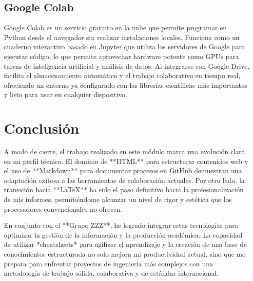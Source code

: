 \documentclass[runningheads]{llncs}
\begin{document}
\subsection{Google Colab}
Google Colab es un servicio gratuito en la nube que permite programar en Python desde el navegador sin realizar instalaciones locales. Funciona como un cuaderno interactivo basado en Jupyter que utiliza los servidores de Google para ejecutar código, lo que permite aprovechar hardware potente como GPUs para tareas de inteligencia artificial y análisis de datos. Al integrarse con Google Drive, facilita el almacenamiento automático y el trabajo colaborativo en tiempo real, ofreciendo un entorno ya configurado con las librerías científicas más importantes y listo para usar en cualquier dispositivo.



\section{Conclusión}
A modo de cierre, el trabajo realizado en este módulo marca una evolución clara en mi perfil técnico. El dominio de **HTML** para estructurar contenidos web y el uso de **Markdown** para documentar procesos en GitHub demuestran una adaptación exitosa a las herramientas de colaboración actuales. Por otro lado, la transición hacia **LaTeX** ha sido el paso definitivo hacia la profesionalización de mis informes, permitiéndome alcanzar un nivel de rigor y estética que los procesadores convencionales no ofrecen.

En conjunto con el **Grupo ZZZ**, he logrado integrar estas tecnologías para optimizar la gestión de la información y la producción académica. La capacidad de utilizar *cheatsheets* para agilizar el aprendizaje y la creación de una base de conocimientos estructurada no solo mejora mi productividad actual, sino que me prepara para enfrentar proyectos de ingeniería más complejos con una metodología de trabajo sólida, colaborativa y de estándar internacional.
\end{document}
